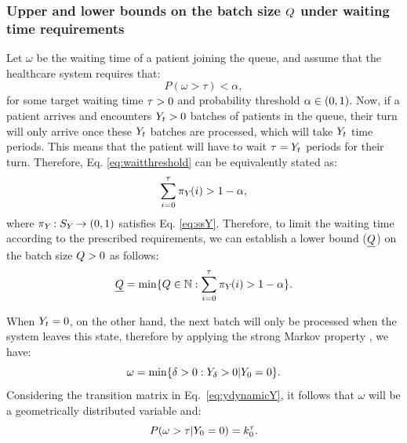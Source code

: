 \subsubsection{Upper and lower bounds on the batch size $Q$ under waiting time requirements} \label{sec:bounds}

Let $\omega$ be the waiting time of a patient joining the queue, and assume that the healthcare system requires that:
%
\begin{equation} \label{eq:waitthreshold}
P( \omega > \tau ) < \alpha,
\end{equation}
%
for some target waiting time $\tau >0$ and probability threshold $\alpha \in (0,1)$. Now, if a patient arrives and encounters $Y_{t} > 0$ batches of patients in the queue, their turn will only arrive once these $Y_{t}$ batches are processed, which will take $Y_{t}$ time periods. This means that the patient will have to wait $\tau = Y_{t}$ periods for their turn. Therefore, Eq. \eqref{eq:waitthreshold} can be equivalently stated as:
%
\begin{equation} \label{eq:waitthresholdy}
\sum_{i = 0}^\tau \pi_{Y_{}}(i) > 1 - \alpha,
\end{equation}
%
where $\pi_{Y_{}} : S_{Y_{}} \to (0,1)$ satisfies Eq. \eqref{eq:ssY}. Therefore, to limit the waiting time according to the prescribed requirements, we can establish a lower bound ($\underline{Q}$) on the batch size $Q > 0$ as follows:
%
\begin{equation} \label{eq:under}
\underline{Q} = \min \{ Q \in \mathbb N : \sum_{i = 0}^\tau \pi_{Y_{}}(i) > 1- \alpha \}.
\end{equation}

When $Y_{t} = 0$, on the other hand, the next batch will only be processed when the system leaves this state, therefore by applying the strong Markov property \citep{Bremaud2020}, we have:
%
\[
\omega = \min \{\delta > 0 : Y_{\delta} > 0 | Y_{0} = 0 \}.
\]
%
Considering the transition matrix in Eq.~\eqref{eq:ydynamicY}, it follows that $\omega$ will be a geometrically distributed variable and:
%
\begin{equation} \label{eq:upperbound}
P( \omega > \tau | Y_{0} = 0 )  = k_0^{\tau}.
\end{equation}

